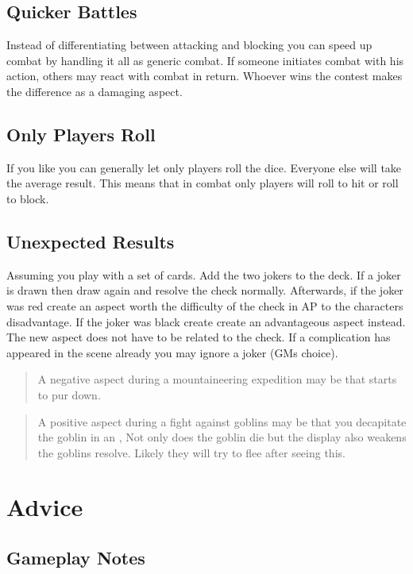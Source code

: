 \documentclass[11pt]{article}
\begin{document}
{\subsection{Quicker Battles}
\label{sec:orgab87fd0}

Instead of differentiating between attacking and blocking you can speed up combat by handling it all as generic combat. If someone initiates combat with his action, others may react with combat in return. Whoever wins the contest makes the difference as a damaging aspect.
\subsection{Only Players Roll}
\label{sec:org52ffbe5}
If you like you can generally let only players roll the dice. Everyone else will take the average result. This means that in combat only players will roll to hit or roll to block.
\subsection{Unexpected Results}
\label{sec:org16dbda0}
Assuming you play with a set of cards. Add the two jokers to the deck. If a joker is drawn then draw again and resolve the check normally. Afterwards, if the joker was red create an aspect worth the difficulty of the check in AP to the characters disadvantage. If the joker was black create create an advantageous aspect instead. The new aspect does not have to be related to the check.
If a complication has appeared in the scene already you may ignore a joker (GMs choice).

\begin{quote}
A negative aspect during a mountaineering expedition may be that  starts to pur down.
\end{quote}

\begin{quote}
A positive aspect during a fight against goblins may be that you decapitate the goblin in an , Not only does the goblin die but the display also weakens the goblins resolve. Likely they will try to flee after seeing this.
\end{quote}
\section{Advice}
\label{sec:org2843bf2}
\subsection{Gameplay Notes}
\label{sec:orgefd1330}

}
\end{document}
